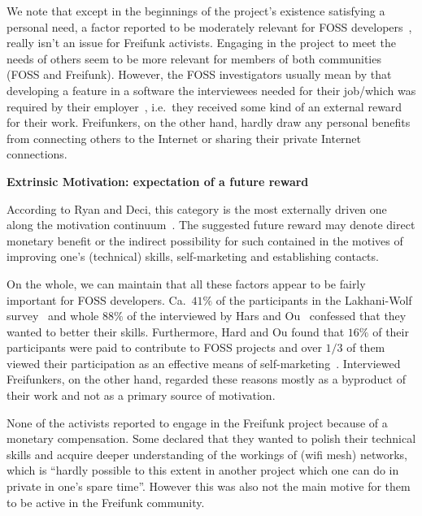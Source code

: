 We note that except in the beginnings of the project's existence satisfying a personal need,
a factor reported to be moderately relevant for FOSS developers~\cite{LakWo2005},
really isn't an issue for Freifunk activists.
Engaging in the project to meet the needs of others seem to be more relevant for members of both communities (FOSS and Freifunk).
However, the FOSS investigators usually mean by that developing a feature in a software the interviewees needed for their job/which was required by their employer~\cite{LakWo2005}, i.e.\ they received some kind of an external reward for their work.
Freifunkers, on the other hand, hardly draw any personal benefits from connecting others to the Internet or sharing their private Internet connections.




\textbf{Extrinsic Motivation: expectation of a future reward}

According to Ryan and Deci, this category is the most externally driven one along the motivation continuum~\cite{RyDe2000}.
The suggested future reward may denote direct monetary benefit or the indirect possibility for such contained in the motives of improving one's (technical) skills, self-marketing and establishing contacts.

On the whole, we can maintain that all these factors appear to be fairly important for FOSS developers.
Ca.\ $41\%$ of the participants in the Lakhani-Wolf survey~\cite{LakWo2005} and whole $88\%$ of the interviewed by Hars and Ou~\cite{HarOu2002} confessed that they wanted to better their skills.
Furthermore, Hard and Ou found that $16\%$ of their participants were paid to contribute to FOSS projects and over $1/3$ of them viewed their participation as an effective means of self-marketing~\cite{HarOu2002}.
Interviewed Freifunkers, on the other hand, regarded these reasons mostly as a byproduct of their work and not as a primary source of motivation.

None of the activists reported to engage in the Freifunk project because of a monetary compensation.
Some declared that they wanted to polish their technical skills and acquire deeper understanding of the workings of (wifi mesh) networks, which is ``hardly possible to this extent in another project which one can do in private in one's spare time''.
However this was also not the main motive for them to be active in the Freifunk community.

